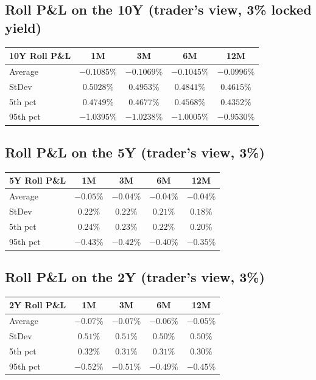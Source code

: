 \documentclass[11pt]{article}
\theoremstyle{definition}
\begin{document}
\subsection{Roll P\&L on the 10Y (trader's view, 3\% locked yield)}
\begin{center}\small
\begin{tabular}{lcccc}
\toprule
\textbf{10Y Roll P\&L} & \textbf{1M} & \textbf{3M} & \textbf{6M} & \textbf{12M}\\
\midrule
Average & $-0.1085\%$ & $-0.1069\%$ & $-0.1045\%$ & $-0.0996\%$\\
StDev   & $0.5028\%$  & $0.4953\%$  & $0.4841\%$  & $0.4615\%$\\
5th pct & $0.4749\%$  & $0.4677\%$  & $0.4568\%$  & $0.4352\%$\\
95th pct & $-1.0395\%$ & $-1.0238\%$ & $-1.0005\%$ & $-0.9530\%$\\
\bottomrule
\end{tabular}
\end{center}

\subsection{Roll P\&L on the 5Y (trader's view, 3\%)}
\begin{center}\small
\begin{tabular}{lcccc}
\toprule
\textbf{5Y Roll P\&L} & \textbf{1M} & \textbf{3M} & \textbf{6M} & \textbf{12M}\\
\midrule
Average & $-0.05\%$ & $-0.04\%$ & $-0.04\%$ & $-0.04\%$\\
StDev   & $0.22\%$  & $0.22\%$  & $0.21\%$  & $0.18\%$\\
5th pct & $0.24\%$  & $0.23\%$  & $0.22\%$  & $0.20\%$\\
95th pct& $-0.43\%$ & $-0.42\%$ & $-0.40\%$ & $-0.35\%$\\
\bottomrule
\end{tabular}
\end{center}

\subsection{Roll P\&L on the 2Y (trader's view, 3\%)}
\begin{center}\small
\begin{tabular}{lcccc}
\toprule
\textbf{2Y Roll P\&L} & \textbf{1M} & \textbf{3M} & \textbf{6M} & \textbf{12M}\\
\midrule
Average & $-0.07\%$ & $-0.07\%$ & $-0.06\%$ & $-0.05\%$\\
StDev   & $0.51\%$  & $0.51\%$  & $0.50\%$  & $0.50\%$\\
5th pct & $0.32\%$  & $0.31\%$  & $0.31\%$  & $0.30\%$\\
95th pct& $-0.52\%$ & $-0.51\%$ & $-0.49\%$ & $-0.45\%$\\
\bottomrule
\end{tabular}
\end{center}
\end{document}
